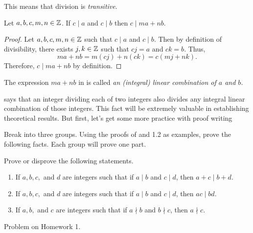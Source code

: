 \documentclass{ximera}
\begin{document}
This means that division is \emph{transitive}. 


\begin{proposition}\label{prop:linear-combo}
  Let $a,b,c,m,n\in\mathbb Z$.
  If $c\mid a$ and $c\mid b$ then $c\mid ma+nb$.

  \begin{proof}
    Let $a,b,c,m,n\in\mathbb Z$ such that $c\mid a$ and $c\mid b$. Then by definition of divisibility, there exists $j,k\in\mathbb Z$ such that $cj=a$ and $ck=b$. Thus, \[ma+nb=m(cj)+n(ck)=c(mj+nk).\] Therefore, $c\mid ma+nb$ by definition.
  \end{proof}
\end{proposition}

\begin{defn}
The expression $ma+nb$ in  is called \emph{an (integral) linear combination of $a$ and $b$.}
\end{defn}
 says that an integer dividing each of two integers also divides any integral linear combination of those integers. This fact will be extremely valuable in establishing theoretical results. But first, let's get some more practice with proof writing

Break into three groups. Using the proofs of  and 1.2 as examples, prove the following facts. Each group will prove one part.

\begin{br}\label{divisfacts}
Prove or disprove the following statements.
\begin{enumerate}[label=(\alph*)]
\item If $a,b,c,$ and $d$ are integers such that if $a\mid b$ and $c\mid d$, then $a+c\mid b+d$.
\item If $a,b,c,$ and $d$ are integers such that if $a\mid b$ and $c\mid d$, then $ac\mid bd$.
\item If $a,b,$ and $c$ are integers such that if $a\nmid b$ and $b\nmid c$, then $a\nmid c$.
\end{enumerate}
\end{br}
\begin{solution}
Problem on Homework 1.
\end{solution}
\end{document}
